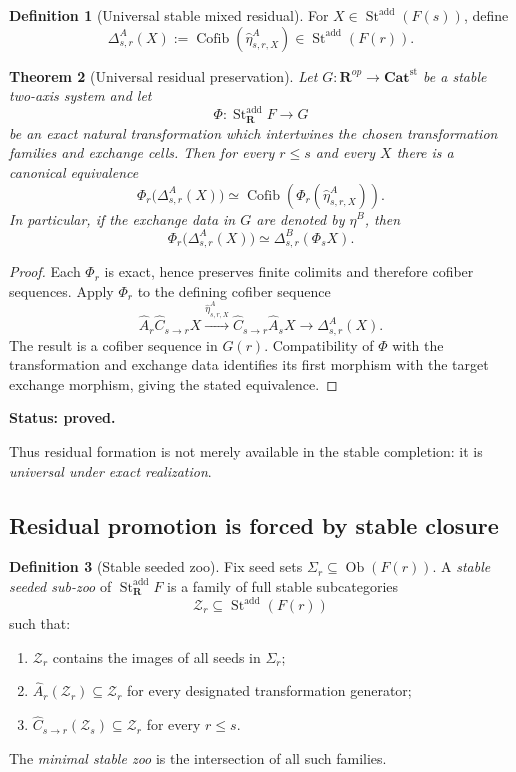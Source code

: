 \documentclass[11pt]{article}
\newtheorem{theorem}{Theorem}[section]
\theoremstyle{definition}
\newtheorem{definition}[theorem]{Definition}
\theoremstyle{remark}
\newcommand{\Rcat}{\mathbf R}
\newcommand{\Ob}{\operatorname{Ob}}
\newcommand{\Cofib}{\operatorname{Cofib}}
\newcommand{\Seeds}{\Sigma}
\newcommand{\status}[1]{\textbf{Status: #1.}}
\begin{document}
\begin{definition}[Universal stable mixed residual]\label{def:universal-residual}
For $X\in\operatorname{St}^{\mathrm{add}}(F(s))$, define
\[
\Delta^A_{s,r}(X)
:=
\Cofib\!\left(
\widehat\eta^A_{s,r,X}
\right)
\in
\operatorname{St}^{\mathrm{add}}(F(r)).
\]
\end{definition}

\begin{theorem}[Universal residual preservation]\label{thm:residual-preservation}
Let $G:\Rcat^{op}\to\mathbf{Cat}^{\mathrm{st}}$ be a stable two-axis system and let
\[
\Phi:\operatorname{St}^{\mathrm{add}}_{\Rcat}F\longrightarrow G
\]
be an exact natural transformation which intertwines the chosen transformation families and exchange cells. Then for every $r\le s$ and every $X$ there is a canonical equivalence
\[
\Phi_r\bigl(\Delta^A_{s,r}(X)\bigr)
\simeq
\Cofib\!\left(
\Phi_r(\widehat\eta^A_{s,r,X})
\right).
\]
In particular, if the exchange data in $G$ are denoted by $\eta^B$, then
\[
\Phi_r\bigl(\Delta^A_{s,r}(X)\bigr)
\simeq
\Delta^B_{s,r}(\Phi_sX).
\]
\end{theorem}

\begin{proof}
Each $\Phi_r$ is exact, hence preserves finite colimits and therefore cofiber sequences. Apply $\Phi_r$ to the defining cofiber sequence
\[
\widehat A_r\widehat C_{s\to r}X
\xrightarrow{\widehat\eta^A_{s,r,X}}
\widehat C_{s\to r}\widehat A_sX
\longrightarrow
\Delta^A_{s,r}(X).
\]
The result is a cofiber sequence in $G(r)$. Compatibility of $\Phi$ with the transformation and exchange data identifies its first morphism with the target exchange morphism, giving the stated equivalence.
\end{proof}

\status{proved}

Thus residual formation is not merely available in the stable completion: it is \emph{universal under exact realization}.

\subsection{Residual promotion is forced by stable closure}

\begin{definition}[Stable seeded zoo]
Fix seed sets $\Seeds_r\subseteq\Ob(F(r))$. A \emph{stable seeded sub-zoo} of $\operatorname{St}^{\mathrm{add}}_{\Rcat}F$ is a family of full stable subcategories
\[
\mathcal Z_r\subseteq\operatorname{St}^{\mathrm{add}}(F(r))
\]
such that:
\begin{enumerate}
    \item $\mathcal Z_r$ contains the images of all seeds in $\Seeds_r$;
    \item $\widehat A_r(\mathcal Z_r)\subseteq\mathcal Z_r$ for every designated transformation generator;
    \item $\widehat C_{s\to r}(\mathcal Z_s)\subseteq\mathcal Z_r$ for every $r\le s$.
\end{enumerate}
The \emph{minimal stable zoo} is the intersection of all such families.
\end{definition}
\end{document}
